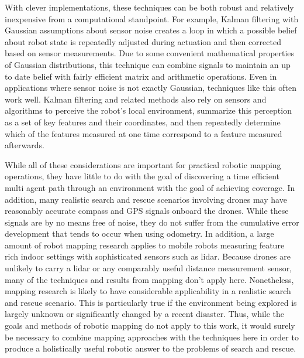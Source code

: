 With clever implementations, these techniques can be both robust and relatively inexpensive from a computational standpoint. For example, Kalman filtering with Gaussian assumptions about sensor noise creates a loop in which a possible belief about robot state is repeatedly adjusted during actuation and then corrected based on sensor measurements. Due to some convenient mathematical properties of Gaussian distributions, this technique can combine signals to maintain an up to date belief with fairly efficient matrix and arithmetic operations. Even in applications where sensor noise is not exactly Gaussian, techniques like this often work well. Kalman filtering and related methods also rely on sensors and algorithms to perceive the robot's local environment, summarize this perception as a set of key features and their coordinates, and then repeatedly determine which of the features measured at one time correspond to a feature measured afterwards.


While all of these considerations are important for practical robotic mapping operations, they have little to do with the goal of discovering a time efficient multi agent path through an environment with the goal of achieving coverage. In addition, many realistic search and rescue scenarios involving drones may have reasonably accurate compass and GPS signals onboard the drones. While these signals are by no means free of noise, they do not suffer from the cumulative error development that tends to occur when using odometry. In addition, a large amount of robot mapping research applies to mobile robots measuring feature rich indoor settings with sophisticated sensors such as lidar. Because drones are unlikely to carry a lidar or any comparably useful distance measurement sensor, many of the techniques and results from mapping don't apply here. Nonetheless, mapping research is likely to have considerable applicability in a realistic search and rescue scenario. This is particularly true if the environment being explored is largely unknown or significantly changed by a recent disaster. Thus, while the goals and methods of robotic mapping do not apply to this work, it would surely be necessary to combine mapping approaches with the techniques here in order to produce a holistically useful robotic answer to the problems of search and rescue.
